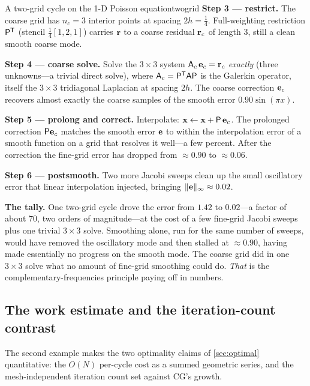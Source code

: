\begin{workedexample}{A two-grid cycle on the 1-D Poisson equation}{twogrid}
\textbf{Step 3 --- restrict.} The coarse grid has $n_c=3$ interior points at spacing
$2h=\tfrac14$. Full-weighting restriction $\mathsf{P}^{\mathsf T}$ (stencil
$\tfrac14[1,2,1]$) carries $\mathbf{r}$ to a coarse residual $\mathbf{r}_c$ of length $3$, still a clean
smooth coarse mode.

\textbf{Step 4 --- coarse solve.} Solve the $3\times 3$ system
$\mathsf{A}_c\,\mathbf{e}_c = \mathbf{r}_c$ \emph{exactly} (three unknowns---a trivial direct solve), where
$\mathsf{A}_c = \mathsf{P}^{\mathsf T}\mathsf{A}\mathsf{P}$ is the Galerkin operator,
itself the $3\times3$ tridiagonal Laplacian at spacing $2h$. The coarse correction $\mathbf{e}_c$
recovers almost exactly the coarse samples of the smooth error $0.90\sin(\pi x)$.

\textbf{Step 5 --- prolong and correct.} Interpolate: $\mathbf{x} \leftarrow \mathbf{x} +
\mathsf{P}\,\mathbf{e}_c$. The prolonged correction $\mathsf{P}\mathbf{e}_c$ matches the smooth error $\mathbf{e}$ to
within the interpolation error of a smooth function on a grid that resolves it well---a few
percent. After the correction the fine-grid error has dropped from $\approx 0.90$ to
$\approx 0.06$.

\textbf{Step 6 --- postsmooth.} Two more Jacobi sweeps clean up the small oscillatory error
that linear interpolation injected, bringing $\lVert\mathbf{e}\rVert_\infty \approx 0.02$.

\textbf{The tally.} One two-grid cycle drove the error from $1.42$ to $0.02$---a factor of
about $70$, two orders of magnitude---at the cost of a few fine-grid Jacobi sweeps plus one
trivial $3\times3$ solve. Smoothing alone, run for the same number of sweeps, would have
removed the oscillatory mode and then stalled at $\approx 0.90$, having made essentially no
progress on the smooth mode. The coarse grid did in one $3\times 3$ solve what no amount of
fine-grid smoothing could do. \emph{That} is the complementary-frequencies principle paying
off in numbers.
\end{workedexample}

\subsection{The work estimate and the iteration-count contrast}

The second example makes the two optimality claims of \cref{sec:optimal} quantitative: the
$O(N)$ per-cycle cost as a summed geometric series, and the mesh-independent iteration count
set against CG's growth.

